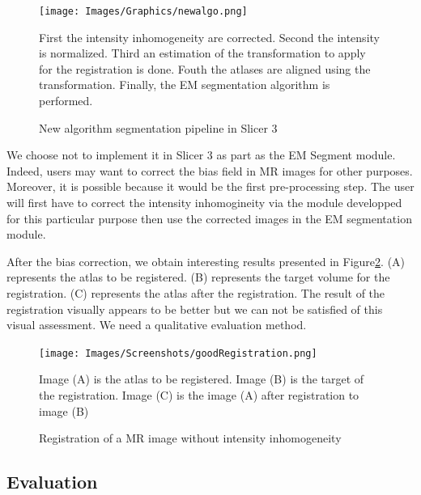 \begin{figure}[ht]\centering
  \texttt{[image: Images/Graphics/newalgo.png]}
  \caption{New algorithm segmentation pipeline in Slicer 3}{First the intensity inhomogeneity are corrected. Second the intensity is normalized. Third an estimation of the transformation to apply for the registration is done. Fouth the atlases are aligned using the transformation. Finally, the EM segmentation algorithm is performed.}\label{fig:wfwbc}
  \end{figure}

\par
We choose not to implement it in Slicer 3 as part as the EM Segment module. Indeed, users may want to correct the bias field in MR images for other purposes. Moreover, it is possible because it would be the first pre-processing step. The user will first have to correct the intensity inhomogineity via the module developped for this particular purpose then use the corrected images in the EM segmentation module.

  
  
\par
After the bias correction, we obtain interesting results presented in Figure\ref{fig:goodRegistration}. (A) represents the atlas to be registered. (B) represents the target volume for the registration. (C) represents the atlas after the registration. The result of the registration visually appears to be better but we can not be satisfied of this visual assessment. We need a qualitative evaluation method.

\begin{figure}\centering
  \texttt{[image: Images/Screenshots/goodRegistration.png]}
  \caption{Registration of a MR image without intensity inhomogeneity}{Image (A) is the atlas to be registered. Image (B) is the target of the registration. Image (C) is the image (A) after registration to image (B)}\label{fig:goodRegistration}
\end{figure}

\subsection{Evaluation}

